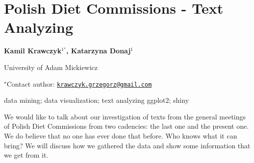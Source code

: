 \documentclass[\main/boa.tex]{subfiles}
\begin{document}
\section{Polish Diet Commissions - Text Analyzing}

\begin{center}
  {\bf Kamil Krawczyk$^{1^\star}$, Katarzyna Donaj$^{1}$}
\end{center}

\vskip 0.3cm

\begin{affiliations}
\begin{enumerate}
\begin{minipage}{0.915\textwidth}
\centering
\item University of Adam Mickiewicz \\[-2pt]
\end{minipage}
\end{enumerate}
$^\star$Contact author: \href{mailto:krawczyk.grzegorz@gmail.com}{\nolinkurl{krawczyk.grzegorz@gmail.com}}\\
\end{affiliations}

\vskip 0.5cm

\begin{minipage}{0.915\textwidth}
\keywords data mining; data visualization; text analyzing
\packages ggplot2; shiny
\end{minipage}

\vskip 0.8cm

We would like to talk about our investigation of texts from the general
meetings of Polish Diet Commissions from two cadencies: the last one and
the present one. We do believe that no one has ever done that before.
Who knows what it can bring? We will discuss how we gathered the data
and show some information that we get from it.
\end{document}
